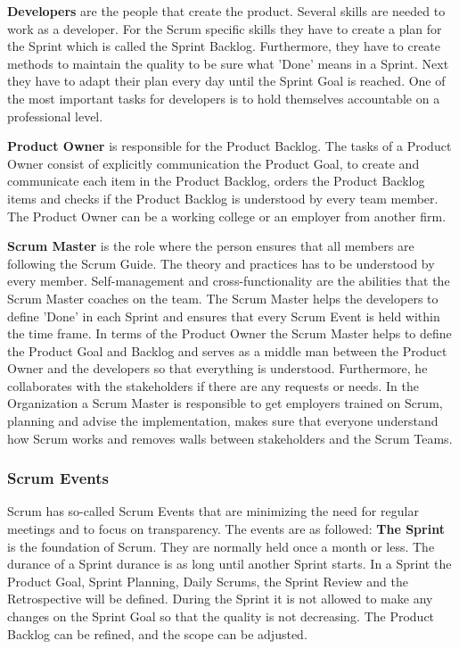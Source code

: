 \textbf{Developers} are the people that create the product. Several skills are needed to work as a developer. For the Scrum specific skills they have to create a plan for the Sprint which is called the Sprint Backlog. Furthermore, they have to create methods to maintain the quality to be sure what 'Done' means in a Sprint. Next they have to adapt their plan every day until the Sprint Goal is reached. One of the most important tasks for developers is to hold themselves accountable on a professional level. \cite{scrum_guide}

\textbf{Product Owner} is responsible for the Product Backlog. The tasks of a Product Owner consist of explicitly communication the Product Goal, to create and communicate each item in the Product Backlog, orders the Product Backlog items and checks if the Product Backlog is understood by every team member. \cite{scrum_guide} The Product Owner can be a working college or an employer from another firm.

\textbf{Scrum Master} is the role where the person ensures that all members are following the Scrum Guide. The theory and practices has to be understood by every member. Self-management and cross-functionality are the abilities that the Scrum Master coaches on the team. The Scrum Master helps the developers to define 'Done' in each Sprint and ensures that every Scrum Event is held within the time frame. In terms of the Product Owner the Scrum Master helps to define the Product Goal and Backlog and serves as a middle man between the Product Owner and the developers so that everything is understood. Furthermore, he collaborates with the stakeholders if there are any requests or needs. In the Organization a Scrum Master is responsible to get employers trained on Scrum, planning and advise the implementation, makes sure that everyone understand how Scrum works and removes walls between stakeholders and the Scrum Teams. \cite{scrum_guide}

\subsubsection{Scrum Events} \label{sec:Scrum Events}
Scrum has so-called Scrum Events that are minimizing the need for regular meetings and to focus on transparency. The events are as followed:
\textbf{The Sprint} is the foundation of Scrum. They are normally held once a month or less. The durance of a Sprint durance is as long until another Sprint starts. In a Sprint the Product Goal, Sprint Planning, Daily Scrums, the Sprint Review and the Retrospective will be defined. During the Sprint it is not allowed to make any changes on the Sprint Goal so that the quality is not decreasing. The Product Backlog can be refined, and the scope can be adjusted. \cite{scrum_guide}

